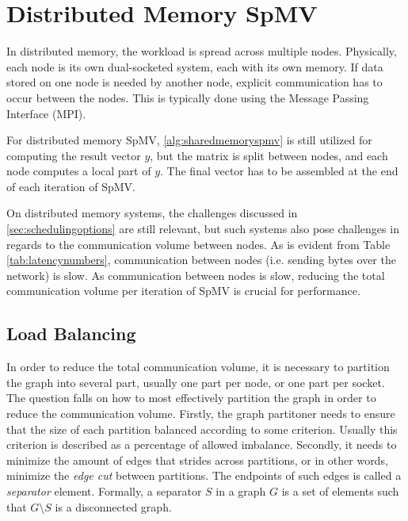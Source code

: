 

\section{Distributed Memory SpMV}

In distributed memory, the workload is spread across multiple nodes. Physically, each node is its own dual-socketed system, each with its own memory. If data stored on one node is needed by another node, explicit communication has to occur between the nodes. This is typically done using the Message Passing Interface (MPI).
\medskip

For distributed memory SpMV, \autoref{alg:sharedmemoryspmv} is still utilized for computing the result vector \(y\), but the matrix is split between nodes, and each node computes a local part of \(y\). The final vector has to be assembled at the end of each iteration of SpMV. 
\medskip

On distributed memory systems, the challenges discussed in \ref{sec:schedulingoptions} are still relevant, but such systems also pose challenges in regards to the communication volume between nodes. As is evident from Table \ref{tab:latencynumbers}, communication between nodes (i.e. sending bytes over the network) is slow. As communication between nodes is slow, reducing the total communication volume per iteration of SpMV is crucial for performance.

\subsection{Load Balancing}
In order to reduce the total communication volume, it is necessary to partition the graph into several part, usually one part per node, or one part per socket. The question falls on how to most effectively partition the graph in order to reduce the communication volume. Firstly, the graph partitoner needs to ensure that the size of each partition balanced according to some criterion. Usually this criterion is described as a percentage of allowed imbalance. Secondly, it needs to minimize the amount of edges that strides across partitions, or in other words, minimize the \textit{edge cut} between partitions. The endpoints of such edges is called a \textit{separator} element. Formally, a separator \(S\) in a graph \(G\) is a set of elements such that \(G \setminus S\) is a disconnected graph.
\medskip

